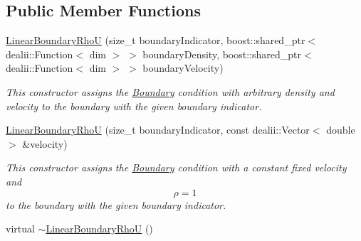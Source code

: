 \subsection*{Public Member Functions}
\begin{DoxyCompactItemize}
\item 
\hyperlink{classnatrium_1_1LinearBoundaryRhoU_a14a9b89c500915afd7945ff151e16b7a}{LinearBoundaryRhoU} (size\_\-t boundaryIndicator, boost::shared\_\-ptr$<$ dealii::Function$<$ dim $>$ $>$ boundaryDensity, boost::shared\_\-ptr$<$ dealii::Function$<$ dim $>$ $>$ boundaryVelocity)
\begin{DoxyCompactList}\small\item\em This constructor assigns the \hyperlink{classnatrium_1_1Boundary}{Boundary} condition with arbitrary density and velocity to the boundary with the given boundary indicator. \item\end{DoxyCompactList}\item 
\hyperlink{classnatrium_1_1LinearBoundaryRhoU_a1c95f6068da74cc69e58611d82f2eee4}{LinearBoundaryRhoU} (size\_\-t boundaryIndicator, const dealii::Vector$<$ double $>$ \&velocity)
\begin{DoxyCompactList}\small\item\em This constructor assigns the \hyperlink{classnatrium_1_1Boundary}{Boundary} condition with a constant fixed velocity and \[ \rho = 1 \] to the boundary with the given boundary indicator. \item\end{DoxyCompactList}\item 
\hypertarget{classnatrium_1_1LinearBoundaryRhoU_ad104a8a9608daf894fd708e4cb20bdef}{
virtual \hyperlink{classnatrium_1_1LinearBoundaryRhoU_ad104a8a9608daf894fd708e4cb20bdef}{$\sim$LinearBoundaryRhoU} ()}
\label{classnatrium_1_1LinearBoundaryRhoU_ad104a8a9608daf894fd708e4cb20bdef}


\end{DoxyCompactItemize}
